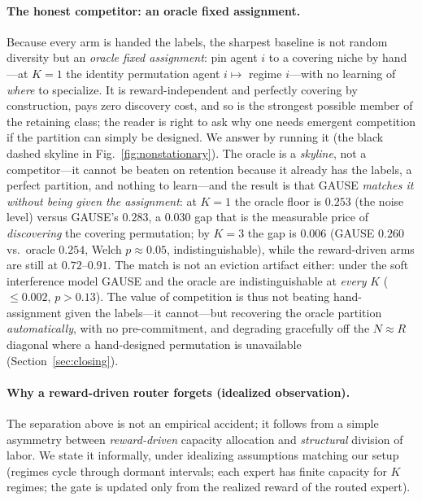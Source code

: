 \documentclass{article}
\begin{document}
\paragraph{The honest competitor: an oracle fixed assignment.} Because every arm
is handed the labels, the sharpest baseline is not random diversity but an
\emph{oracle fixed assignment}: pin agent $i$ to a covering niche by hand---at
$K{=}1$ the identity permutation agent $i\!\mapsto\!$ regime $i$---with no learning
of \emph{where} to specialize. It is reward-independent and perfectly covering by
construction, pays zero discovery cost, and so is the strongest possible member of
the retaining class; the reader is right to ask why one needs emergent competition
if the partition can simply be designed. We answer by running it (the black dashed
skyline in Fig.~\ref{fig:nonstationary}). The oracle is a \emph{skyline}, not a
competitor---it cannot be beaten on retention because it already has the labels, a
perfect partition, and nothing to learn---and the result is that GAUSE \emph{matches
it without being given the assignment}: at $K{=}1$ the oracle floor is $0.253$ (the
noise level) versus GAUSE's $0.283$, a $0.030$ gap that is the measurable price of
\emph{discovering} the covering permutation; by $K{=}3$ the gap is $0.006$ (GAUSE
$0.260$ vs.\ oracle $0.254$, Welch $p\approx0.05$, indistinguishable), while the
reward-driven arms are still at $0.72$--$0.91$. The match is not an eviction
artifact either: under the soft interference model GAUSE and the oracle are
indistinguishable at \emph{every} $K$ ($\le0.002$, $p>0.13$). The value of
competition is thus not beating hand-assignment given the labels---it cannot---but
recovering the oracle partition \emph{automatically}, with no pre-commitment, and
degrading gracefully off the $N\approx R$ diagonal where a hand-designed permutation
is unavailable (Section~\ref{sec:closing}).

\paragraph{Why a reward-driven router forgets (idealized observation).} The
separation above is not an empirical accident; it follows from a simple asymmetry
between \emph{reward-driven} capacity allocation and \emph{structural} division of
labor. We state it informally, under idealizing assumptions matching our setup
(regimes cycle through dormant intervals; each expert has finite capacity for $K$
regimes; the gate is updated only from the realized reward of the routed expert).
\end{document}
